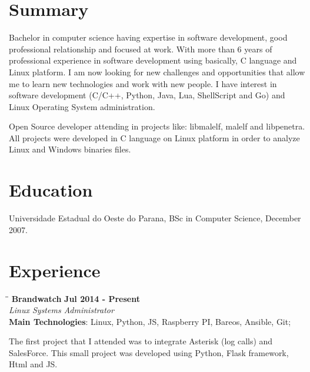 \documentclass[margin]{res}
\begin{document}
  

\address{Brighton, UK \\ benatto@gmail.com \\ Phone: +44 07424600850 \\ Post Code: BN21HF }
                           
                        
\begin{resume}                        
 
\section{Summary}       Bachelor in computer science having expertise in software development, good professional   
                        relationship and focused at work. With more than 6 years of professional experience in software development using basically, C language and Linux platform. I am now looking for new challenges and opportunities that allow me to learn new technologies and work with new people. I have interest in software development (C/C++, Python, Java, Lua, ShellScript and Go) and Linux Operating System administration.
                        
                        Open Source developer attending in projects like: libmalelf, malelf and libpenetra. All projects were developed in C language on Linux platform in order to analyze Linux and Windows binaries files.
 
\section{Education}	Universidade Estadual do Oeste do Parana, BSc in Computer Science, December 2007.
  
\section{Experience}

\vspace{-0.1in}
   \begin{tabbing}
   \hspace{2.3in}\= \hspace{1.7in}\= \kill %
    \textbf{Brandwatch}    \>\>\textbf{Jul 2014 - Present}\\
    \textit{Linux Systems Administrator}\\        
    \textbf{Main Technologies}: Linux, Python, JS, Raspberry PI, Bareos, Ansible, Git;
   \end{tabbing}\vspace{-20pt}      %
    \vspace{2mm}
The first project that I attended was to integrate Asterisk (log calls) and SalesForce. This small project was developed using Python, Flask framework, Html and JS.


\end{resume}
\end{document}
